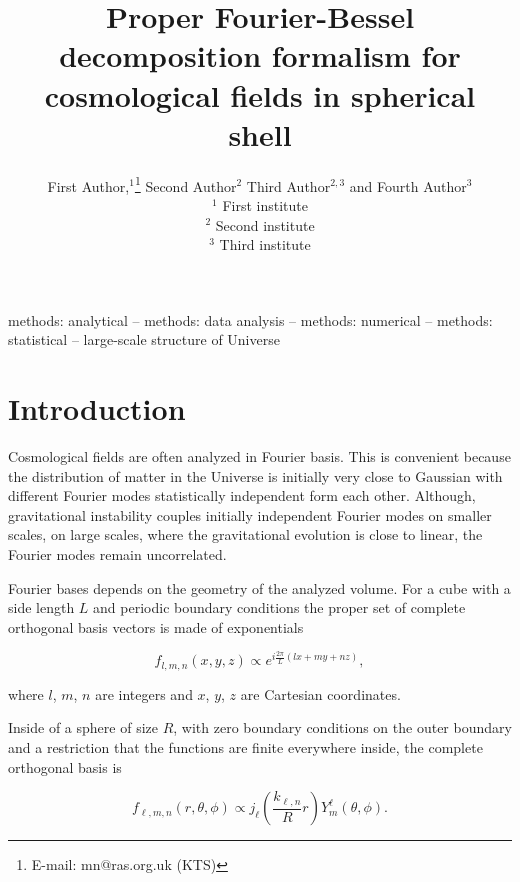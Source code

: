 \documentclass[fleqn,usenatbib]{mnras}
\title[Basis for spherical shells]{Proper Fourier-Bessel decomposition formalism for cosmological fields in spherical shell}
\author[First Author et al.]{
First Author,$^{1}$\thanks{E-mail: mn@ras.org.uk (KTS)}
Second Author$^{2}$
Third Author$^{2,3}$
and Fourth Author$^{3}$
\\
$^{1}$ First institute\\
$^{2}$ Second institute\\
$^{3}$ Third institute
}
\begin{document}
\label{firstpage}
\pagerange{\pageref{firstpage}--\pageref{lastpage}}
\maketitle

\begin{abstract}
\end{abstract}

\begin{keywords}
methods: analytical -- methods: data analysis -- methods: numerical -- methods: statistical -- large-scale structure of Universe
\end{keywords}



\section{Introduction}

Cosmological fields are often analyzed in Fourier basis. This is convenient
because the distribution of matter in the Universe is initially very close to
Gaussian with different Fourier modes statistically independent form each other.
Although, gravitational instability couples initially independent Fourier modes
on smaller scales, on large scales, where the gravitational evolution is close
to linear, the Fourier modes remain uncorrelated.

Fourier bases depends on the geometry of the analyzed volume. For a cube with a
side length $L$ and  periodic boundary conditions the proper set of complete
orthogonal basis vectors is made of exponentials 

\begin{equation}
\label{eq:Fcube}
f_{l,m,n}(x,y,z)\propto e^{i\frac{2\pi}{L}\left(lx + my + nz\right)},
\end{equation}

where $l$, $m$, $n$ are integers and $x$, $y$, $z$ are Cartesian coordinates.

Inside of a sphere of size $R$, with zero boundary conditions on the outer
boundary and a restriction that the functions are finite everywhere inside, the
complete orthogonal basis is

\begin{equation}
\label{eq:Fsphere}
f_{\ell,m,n}(r,\theta,\phi) \propto j_\ell\left(\frac{k_{\ell,n}} {R}r\right)Y^\ell_m
(\theta,\phi).
\end{equation}
\end{document}
